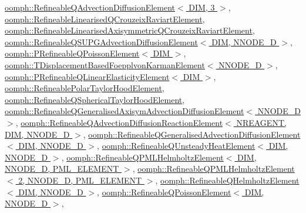 \hyperlink{classoomph_1_1RefineableQAdvectionDiffusionElement_abd5f23d9c5da2bcd579ee279422891f4}{oomph\+::\+Refineable\+Q\+Advection\+Diffusion\+Element$<$ D\+I\+M, 3 $>$}, \hyperlink{classoomph_1_1RefineableLinearisedQCrouzeixRaviartElement_a1c1a77528956ab8a2ac0268511195efd}{oomph\+::\+Refineable\+Linearised\+Q\+Crouzeix\+Raviart\+Element}, \hyperlink{classoomph_1_1RefineableLinearisedAxisymmetricQCrouzeixRaviartElement_ae56c7659e171cf0774b843d7db3ed270}{oomph\+::\+Refineable\+Linearised\+Axisymmetric\+Q\+Crouzeix\+Raviart\+Element}, \hyperlink{classoomph_1_1RefineableQSUPGAdvectionDiffusionElement_a9b52030e939258716797d985a64671ce}{oomph\+::\+Refineable\+Q\+S\+U\+P\+G\+Advection\+Diffusion\+Element$<$ D\+I\+M, N\+N\+O\+D\+E\+\_\+D $>$}, \hyperlink{classoomph_1_1PRefineableQPoissonElement_a19ed70ed56d1e15f8af6eb6ad4a2d892}{oomph\+::\+P\+Refineable\+Q\+Poisson\+Element$<$ D\+I\+M $>$}, \hyperlink{classoomph_1_1TDisplacementBasedFoepplvonKarmanElement_afe81136b4a28e8e61210af5d880fcf72}{oomph\+::\+T\+Displacement\+Based\+Foepplvon\+Karman\+Element$<$ N\+N\+O\+D\+E\+\_\+D $>$}, \hyperlink{classoomph_1_1PRefineableQLinearElasticityElement_afb227be6ae53f1a72a64b58b57d62ef1}{oomph\+::\+P\+Refineable\+Q\+Linear\+Elasticity\+Element$<$ D\+I\+M $>$}, \hyperlink{classoomph_1_1RefineablePolarTaylorHoodElement_ace9784b01dd7184410c22588334238e0}{oomph\+::\+Refineable\+Polar\+Taylor\+Hood\+Element}, \hyperlink{classoomph_1_1RefineableQSphericalTaylorHoodElement_ae08d92d00ba848f4c6f14ad83433334e}{oomph\+::\+Refineable\+Q\+Spherical\+Taylor\+Hood\+Element}, \hyperlink{classoomph_1_1RefineableQGeneralisedAxisymAdvectionDiffusionElement_aea11dc4099c09941839a240a9ca1bff7}{oomph\+::\+Refineable\+Q\+Generalised\+Axisym\+Advection\+Diffusion\+Element$<$ N\+N\+O\+D\+E\+\_\+D $>$}, \hyperlink{classoomph_1_1RefineableQAdvectionDiffusionReactionElement_a836f98dc3fd33e58860d243023a0f991}{oomph\+::\+Refineable\+Q\+Advection\+Diffusion\+Reaction\+Element$<$ N\+R\+E\+A\+G\+E\+N\+T, D\+I\+M, N\+N\+O\+D\+E\+\_\+D $>$}, \hyperlink{classoomph_1_1RefineableQGeneralisedAdvectionDiffusionElement_a5bc265e732c2d5a0c9e5bb699c1cdc6e}{oomph\+::\+Refineable\+Q\+Generalised\+Advection\+Diffusion\+Element$<$ D\+I\+M, N\+N\+O\+D\+E\+\_\+D $>$}, \hyperlink{classoomph_1_1RefineableQUnsteadyHeatElement_ae216355ba4c445c8d9b46fe4c799c482}{oomph\+::\+Refineable\+Q\+Unsteady\+Heat\+Element$<$ D\+I\+M, N\+N\+O\+D\+E\+\_\+D $>$}, \hyperlink{classoomph_1_1RefineableQPMLHelmholtzElement_ab60d67d814159aa25c5b0f980786d3f6}{oomph\+::\+Refineable\+Q\+P\+M\+L\+Helmholtz\+Element$<$ D\+I\+M, N\+N\+O\+D\+E\+\_\+D, P\+M\+L\+\_\+\+E\+L\+E\+M\+E\+N\+T $>$}, \hyperlink{classoomph_1_1RefineableQPMLHelmholtzElement_ab60d67d814159aa25c5b0f980786d3f6}{oomph\+::\+Refineable\+Q\+P\+M\+L\+Helmholtz\+Element$<$ 2, N\+N\+O\+D\+E\+\_\+D, P\+M\+L\+\_\+\+E\+L\+E\+M\+E\+N\+T $>$}, \hyperlink{classoomph_1_1RefineableQHelmholtzElement_ab5156aa04802c1bea18173abbe94cc20}{oomph\+::\+Refineable\+Q\+Helmholtz\+Element$<$ D\+I\+M, N\+N\+O\+D\+E\+\_\+D $>$}, \hyperlink{classoomph_1_1RefineableQPoissonElement_a0f8a91fd025517b21f69c0e544daec7a}{oomph\+::\+Refineable\+Q\+Poisson\+Element$<$ D\+I\+M, N\+N\+O\+D\+E\+\_\+D $>$}, 